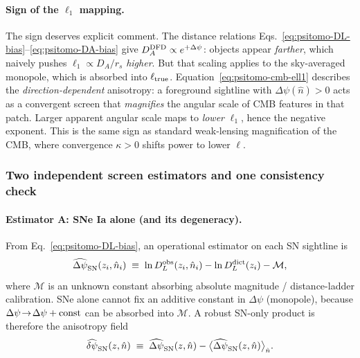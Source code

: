 \paragraph{Sign of the $\ell_1$ mapping.}
The sign deserves explicit comment.  The distance relations Eqs.~\eqref{eq:psitomo-DL-bias}--\eqref{eq:psitomo-DA-bias} give $D_A^{\rm DFD} \propto e^{+\Delta\psi}$: objects appear \emph{farther}, which naively pushes $\ell_1 \propto D_A/r_s$ \emph{higher}.  But that scaling applies to the sky-averaged monopole, which is absorbed into $\ell_{\rm true}$.  Equation~\eqref{eq:psitomo-cmb-ell1} describes the \emph{direction-dependent} anisotropy: a foreground sightline with $\Delta\psi(\hat n) > 0$ acts as a convergent screen that \emph{magnifies} the angular scale of CMB features in that patch.  Larger apparent angular scale maps to \emph{lower} $\ell_1$, hence the negative exponent.  This is the same sign as standard weak-lensing magnification of the CMB, where convergence $\kappa > 0$ shifts power to lower $\ell$.

\subsubsection{Two independent screen estimators and one consistency check}\label{sec:psitomo-estimators}

\paragraph{Estimator A: SNe Ia alone (and its degeneracy).}
From Eq.~\eqref{eq:psitomo-DL-bias}, an operational estimator on each SN sightline is
\begin{equation}
\widehat{\Delta\psi}_{\rm SN}(z_i,\hat n_i)
\;\equiv\;
\ln D_L^{\rm obs}(z_i,\hat n_i) - \ln D_L^{\rm dict}(z_i) - \mathcal{M},
\label{eq:psitomo-est-sn}
\end{equation}
where $\mathcal{M}$ is an unknown constant absorbing absolute magnitude / distance-ladder calibration.
SNe alone cannot fix an additive constant in $\Delta\psi$ (monopole), because $\Delta\psi\!\to\!\Delta\psi+{\rm const}$ can be absorbed into $\mathcal{M}$.
A robust SN-only product is therefore the anisotropy field
\begin{equation}
\widehat{\delta\psi}_{\rm SN}(z,\hat n)\;\equiv\;\widehat{\Delta\psi}_{\rm SN}(z,\hat n)-\big\langle \widehat{\Delta\psi}_{\rm SN}(z,\hat n)\big\rangle_{\hat n}.
\label{eq:psitomo-est-sn-aniso}
\end{equation}

